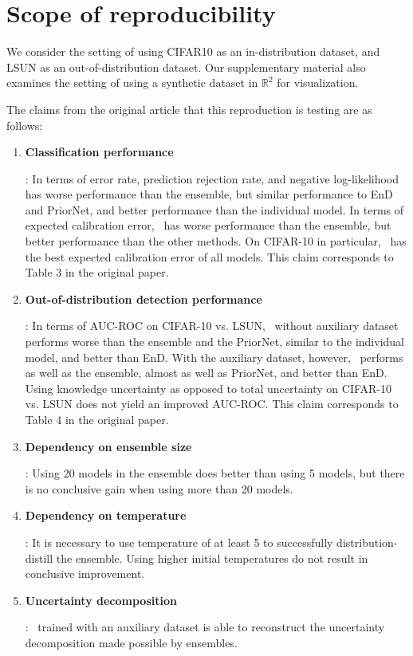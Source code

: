 \section{Scope of reproducibility}
\label{sec:scope-of-reproducibility}

We consider the setting of using CIFAR10 \cite{CIFAR} as an in-distribution dataset, and LSUN \cite{LSUN} as an out-of-distribution dataset. Our supplementary material also examines the setting of using a synthetic dataset in $\mathbb{R}^2$ for visualization.

The claims from the original article that this reproduction is testing are as follows:

\begin{enumerate}
    \item \hypertarget{claim2}{\textbf{Classification performance}}: In terms of error rate, prediction rejection rate, and negative log-likelihood \EnDD has worse performance than the ensemble, but similar performance to EnD and PriorNet, and better performance than the individual model. In terms of expected calibration error, \EnDD \ has worse performance than the ensemble, but better performance than the other methods. On CIFAR-10 in particular, \EnDD \ has the best expected calibration error of all models. This claim corresponds to Table 3 in the original paper. 
    
    \item \hypertarget{claim3}{\textbf{Out-of-distribution detection performance}}: In terms of AUC-ROC on CIFAR-10 vs. LSUN, \EnDD \ without auxiliary dataset performs worse than the ensemble and the PriorNet, similar to the individual model, and better than EnD. With the auxiliary dataset, however, \EnDD \ performs as well as the ensemble, almost as well as PriorNet, and better than EnD. Using knowledge uncertainty as opposed to total uncertainty on CIFAR-10 vs. LSUN does not yield an improved AUC-ROC. This claim corresponds to Table 4 in the original paper. 
    
    \item \hypertarget{claim4}{\textbf{Dependency on ensemble size}}: Using 20 models in the ensemble does better than using 5 models, but there is no conclusive gain when using more than 20 models.
    
    \item \hypertarget{claim5}{\textbf{Dependency on temperature}}: It is necessary to use temperature of at least 5 to successfully distribution-distill the ensemble. Using higher initial temperatures do not result in conclusive improvement.    
    
    \item \hypertarget{claim5}{\textbf{Uncertainty decomposition}}: \EnDD \ trained with an auxiliary dataset is able to reconstruct the uncertainty decomposition made possible by ensembles.
    
\end{enumerate}

